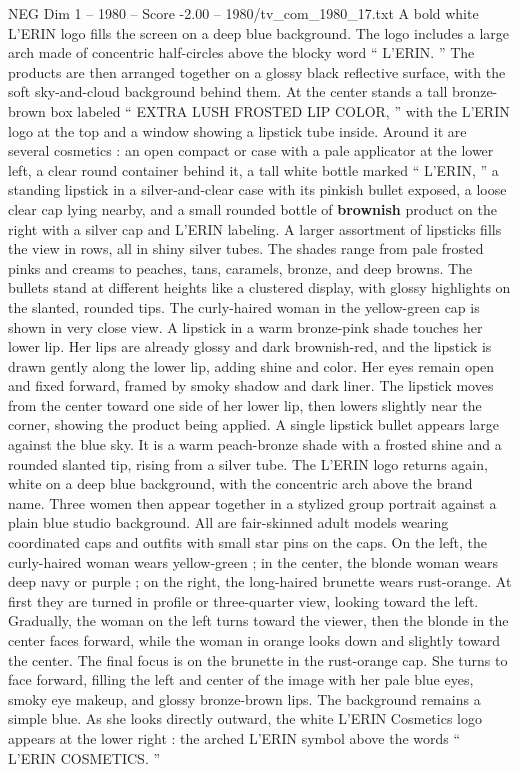 \begin{textsample}{NEG Dim 1 – 1980 – Score -2.00 – 1980/tv\_com\_1980\_17.txt}
A bold white L’ERIN logo fills the screen on a deep blue background.
The logo includes a large arch made of concentric half-circles above the blocky word “ L’ERIN. ” The products are then arranged together on a glossy black reflective surface, with the soft sky-and-cloud background behind them.
At the center stands a tall bronze-brown box labeled “ EXTRA LUSH FROSTED LIP COLOR, ” with the L’ERIN logo at the top and a window showing a lipstick tube inside.
Around it are several cosmetics : an open compact or case with a pale applicator at the lower left, a clear round container behind it, a tall white bottle marked “ L’ERIN, ” a standing lipstick in a silver-and-clear case with its pinkish bullet exposed, a loose clear cap lying nearby, and a small rounded bottle of \textbf{brownish} product on the right with a silver cap and L’ERIN labeling.
A larger assortment of lipsticks fills the view in rows, all in shiny silver tubes.
The shades range from pale frosted pinks and creams to peaches, tans, caramels, bronze, and deep browns.
The bullets stand at different heights like a clustered display, with glossy highlights on the slanted, rounded tips.
The curly-haired woman in the yellow-green cap is shown in very close view.
A lipstick in a warm bronze-pink shade touches her lower lip.
Her lips are already glossy and dark brownish-red, and the lipstick is drawn gently along the lower lip, adding shine and color.
Her eyes remain open and fixed forward, framed by smoky shadow and dark liner.
The lipstick moves from the center toward one side of her lower lip, then lowers slightly near the corner, showing the product being applied.
A single lipstick bullet appears large against the blue sky.
It is a warm peach-bronze shade with a frosted shine and a rounded slanted tip, rising from a silver tube.
The L’ERIN logo returns again, white on a deep blue background, with the concentric arch above the brand name.
Three women then appear together in a stylized group portrait against a plain blue studio background.
All are fair-skinned adult models wearing coordinated caps and outfits with small star pins on the caps.
On the left, the curly-haired woman wears yellow-green ; in the center, the blonde woman wears deep navy or purple ; on the right, the long-haired brunette wears rust-orange.
At first they are turned in profile or three-quarter view, looking toward the left.
Gradually, the woman on the left turns toward the viewer, then the blonde in the center faces forward, while the woman in orange looks down and slightly toward the center.
The final focus is on the brunette in the rust-orange cap.
She turns to face forward, filling the left and center of the image with her pale blue eyes, smoky eye makeup, and glossy bronze-brown lips.
The background remains a simple blue.
As she looks directly outward, the white L’ERIN Cosmetics logo appears at the lower right : the arched L’ERIN symbol above the words “ L’ERIN COSMETICS. ”

\end{textsample}
